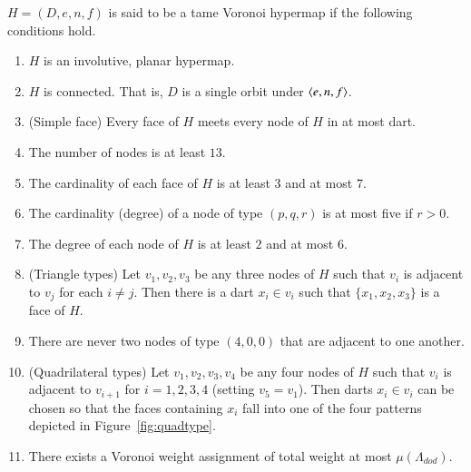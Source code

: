 \begin{definition}
$H=(D,e,n,f)$ is said to be a tame Voronoi hypermap if the following conditions
hold.
\begin{enumerate}
\item $H$ is an involutive, planar hypermap.
\item $H$ is connected.  That is, $D$ is a single orbit under $\langle e,n,f\rangle$.
\item (Simple face) Every face of $H$ meets every node of $H$ in at most
dart.
\item The number of nodes is at least $13$.
\item The cardinality of each face of $H$ is at least $3$ and at most $7$.
\item The cardinality (degree) of a node of type $(p,q,r)$ is at most five if $r>0$.
\item The degree of each node of $H$ is at least $2$ and at most $6$.
\item (Triangle types) Let $v_1,v_2,v_3$ be any three nodes of $H$ such that $v_i$ is adjacent to $v_j$
for each $i\ne j$.  Then there is a dart $x_i\in v_i$ such that $\{x_1,x_2,x_3\}$ is
a face of $H$.
\item There are never two nodes of type $(4,0,0)$ that are adjacent to one another.
\item (Quadrilateral types) 
Let $v_1,v_2,v_3,v_4$ be any four nodes of $H$ such that $v_i$ is adjacent
to $v_{i+1}$ for $i=1,2,3,4$ (setting $v_5=v_1$).  Then darts $x_i\in v_i$ can be chosen
so that the faces containing $x_i$ fall into one of the four patterns depicted
in Figure~\ref{fig:quadtype}.
\item There exists a Voronoi weight assignment of total weight at most $\mu(\Lambda_{dod})$.
\end{enumerate}
\end{definition}

\begin{floatingfigure}{80mm}
  \begin{center}
   \end{center}
  \caption{}
\label{fig:quadtype}
\end{floatingfigure}




